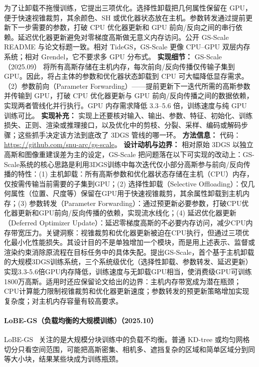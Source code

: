 为了让卸载不拖慢训练，它提出三项优化。选择性卸载把几何属性保留在 GPU，便于快速视锥裁剪，其余颜色、SH 或优化器状态放在主机。参数转发通过提前更新下一步需要的参数，打破 CPU 优化器更新和 GPU 前向/反向之间的串行依赖。延迟优化器更新避免对零梯度高斯做无意义内存访问。公开 GS-Scale README 与论文标题一致。相对 TideGS，GS-Scale 更像 CPU--GPU 双层内存系统；相对 Grendel，它不要求多 GPU 分布式。
\textbf{实现细节：} GS-Scale（2025.09） 将所有高斯存储在主机内存，每次前向/反向传播仅传输子集到 GPU。因此，将占主体的参数和优化器状态卸载到 CPU 可大幅降低显存需求。（2）参数前向（Parameter Forwarding）——提前更新下一迭代所需的高斯参数并传输到 GPU，打破 CPU 优化器更新与 GPU 前向/反向传播之间的数据依赖，实现两者管线化并行执行。GPU 内存需求降低 3.3--5.6 倍，训练速度与纯 GPU 训练可比。
\textbf{实现补充：} 实现上还要核对输入、输出、参数、特征、初始化、训练损失、正则、渲染或推理接口，以及优化中的剪枝、分裂、采样、编码或解码步骤；这些抓手决定该方法到底改了 3DGS 管线的哪一环。
\textbf{方法信息：} 代码：\url{https://github.com/snu-arc/gs-scale}。
\textbf{设计动机与边界：} 相对原始 3DGS 以独立高斯和图像重建误差为主的设定，GS-Scale 把问题落在以下可实现的改动上：GS-Scale系统的核心思路是利用3DGS训练中每次迭代仅小部分高斯参与前向/反向传播的特性：(1) 主机卸载：所有高斯参数和优化器状态存储在主机（CPU）内存，仅按需传输当前需要的子集到GPU；(2) 选择性卸载（Selective Offloading）：仅几何属性（位置、尺度等）保留在GPU用于快速视锥裁剪，其余属性卸载到主机内存；(3) 参数转发（Parameter Forwarding）：通过预更新必要参数，打破CPU优化器更新和GPU前向/反向传播的依赖，实现流水线化；(4) 延迟优化器更新（Deferred Optimizer Update）：延迟零梯度高斯的不必要内存访问，减少CPU内存带宽压力。关键洞察：视锥裁剪和优化器更新被迫在CPU执行，但通过三项优化最小化性能损失。其设计目的不是单独增加一个模块，而是用上述表示、监督或渲染约束消除原流程在目标任务中的具体失配。提出GS-Scale，首个基于主机卸载的大规模3DGS训练系统，三个系统级优化（选择性卸载、参数转发、延迟更新）实现3.3-5.6倍GPU内存降低，训练速度与无卸载GPU相当，使消费级GPU可训练1800万高斯。适用时还应保留论文给出的边界：主机内存带宽成为潜在瓶颈；CPU计算能力限制视锥裁剪和优化器更新速度；参数转发的预更新策略增加实现复杂度；对主机内存容量有较高要求。
\paragraph{LoBE-GS（负载均衡的大规模训练）（2025.10）}
LoBE-GS~\cite{2510_01767} 关注的是大规模分块训练中的负载不均衡。普通 KD-tree 或均匀网格切分只看空间范围，可能把高斯密集、相机多、遮挡复杂的区域和简单区域分到同等大小块，结果某些块成为训练瓶颈。

